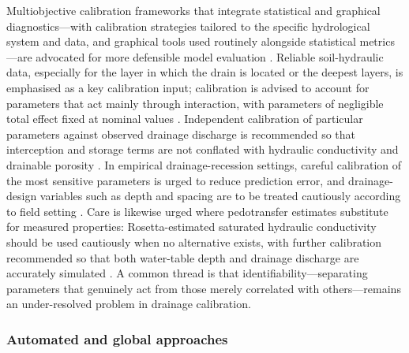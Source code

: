 Multiobjective calibration frameworks that integrate statistical and graphical diagnostics---with calibration strategies tailored to the specific hydrological system and data, and graphical tools used routinely alongside statistical metrics---are advocated for more defensible model evaluation \parencite{Bruhn2025}. Reliable soil-hydraulic data, especially for the layer in which the drain is located or the deepest layers, is emphasised as a key calibration input; calibration is advised to account for parameters that act mainly through interaction, with parameters of negligible total effect fixed at nominal values \parencite{Wang2006}. Independent calibration of particular parameters against observed drainage discharge is recommended so that interception and storage terms are not conflated with hydraulic conductivity and drainable porosity \parencite{Henine2022}. In empirical drainage-recession settings, careful calibration of the most sensitive parameters is urged to reduce prediction error, and drainage-design variables such as depth and spacing are to be treated cautiously according to field setting \parencite{Timalsina2023}. Care is likewise urged where pedotransfer estimates substitute for measured properties: Rosetta-estimated saturated hydraulic conductivity should be used cautiously when no alternative exists, with further calibration recommended so that both water-table depth and drainage discharge are accurately simulated \parencite{Malota2022}. A common thread is that identifiability---separating parameters that genuinely act from those merely correlated with others---remains an under-resolved problem in drainage calibration.

\subsubsection{Automated and global approaches}

